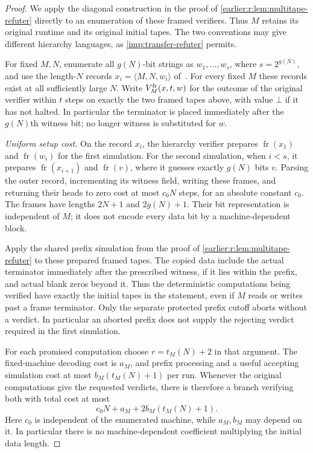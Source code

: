 \begin{proof}
We apply the diagonal construction in the proof of
\cref{earlier:r:lem:multitape-refuter} directly to an enumeration of these
framed verifiers. Thus \(M\) retains its original runtime and its
original initial tapes. The two conventions may give different
hierarchy languages, as \cref{imp:transfer-refuter} permits.

For fixed \(M,N\), enumerate all \(g(N)\)-bit strings as
\(w_1,\ldots,w_s\), where \(s=2^{g(N)}\), and use the length-\(N\)
records \(x_i=\langle M,N,w_i\rangle\) of~\cite[Section~4.1]{CLW20}.
For every fixed \(M\) these records exist at all sufficiently large
\(N\). Write \(V_M^{\rm fr}(x,t,w)\) for the outcome of the original
verifier within \(t\) steps on exactly the two framed tapes above,
with value \(\bot\) if it has not halted. In particular the terminator
is placed immediately after the \(g(N)\)th witness bit; no longer
witness is substituted for \(w\).

\emph{Uniform setup cost.} On the record \(x_i\), the hierarchy
verifier prepares \(\operatorname{fr}(x_1)\) and
\(\operatorname{fr}(w_i)\) for the first simulation. For the second
simulation, when \(i<s\), it prepares \(\operatorname{fr}(x_{i+1})\)
and \(\operatorname{fr}(v)\), where it guesses exactly \(g(N)\) bits
\(v\). Parsing the outer record, incrementing its witness field,
writing these frames, and returning their heads to zero cost at most
\(c_0N\) steps, for an absolute constant \(c_0\). The frames have
lengths \(2N+1\) and \(2g(N)+1\). Their bit representation is
independent of \(M\); it does not encode every data bit by a
machine-dependent block.

Apply the shared prefix simulation from the proof of
\cref{earlier:r:lem:multitape-refuter} to these prepared framed tapes. The
copied data include the actual terminator immediately after the
prescribed witness, if it lies within the prefix, and actual blank
zeros beyond it. Thus the deterministic computations being verified
have exactly the initial tapes in the statement, even if \(M\)
reads or writes past a frame terminator. Only the separate protected
prefix cutoff aborts without a verdict. In particular an aborted
prefix does not supply the rejecting verdict required in the first
simulation.

For each promised computation choose \(r=t_M(N)+2\) in that argument.
The fixed-machine decoding cost is \(a_M\), and prefix processing
and a useful accepting simulation cost at most
\(b_M(t_M(N)+1)\) per run. Whenever the original computations give
the requested verdicts, there is therefore a branch verifying both
with total cost at most
\[
 c_0N+a_M+2b_M(t_M(N)+1).
\]
Here \(c_0\) is independent of the enumerated machine, while
\(a_M,b_M\) may depend on it. In particular there is no
machine-dependent coefficient multiplying the initial data length.


\end{proof}
